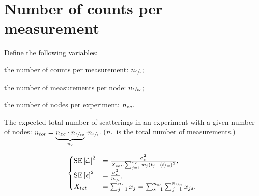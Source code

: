 \documentclass{article}
\begin{document}
%

\section{Number of counts per measurement}

Define the following variables: \begin{inparaenum}
	\item the number of counts per measurement: $n_{\sfrac{c}{\epsilon}}$;
	\item the number of measurements per node: $n_{\sfrac{\epsilon}{zc}}$;
	\item the number of nodes per experiment: $n_{zc}$.
\end{inparaenum}

The expected total number of scatterings in an experiment with a given number of nodes: $n_{tot} = \underbrace{n_{zc}\cdot n_{\sfrac{\epsilon}{zc}}}_{n_{\epsilon}}\cdot n_{\sfrac{c}{\epsilon}}$. ($n_{\epsilon}$ is the total number of measurements.)

\begin{equation}
\begin{cases}
	\SE{\hat{\omega}}^2 &= \frac{\SD{\meas}^2}{X_{tot}\cdot\sum_{j=1}^{\Nm}w_j\bkt{t_j - \avg{t}_w}^2}, \\
	\SE{\meas}^2 &= \frac{\SD{\meas}^2}{\Ncm} ,\\
	X_{tot} &= \sum_{j=1}^{\Nm} x_j = \sum_{s=1}^{\Nnd}\sum_{j=1}^{\Nmnd} x_{js}.
\end{cases}
\end{equation}
\end{document}
